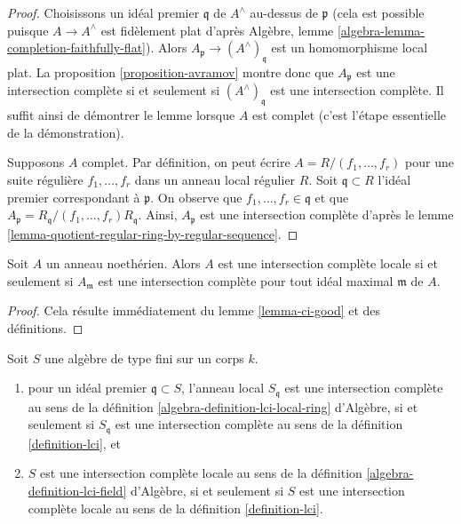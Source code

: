 \begin{proof}
Choisissons un idéal premier $\mathfrak q$ de $A^\wedge$ au-dessus de
$\mathfrak p$
(cela est possible puisque $A \to A^\wedge$ est fidèlement plat d'après
Algèbre, lemme \ref{algebra-lemma-completion-faithfully-flat}).
Alors $A_\mathfrak p \to (A^\wedge)_\mathfrak q$ est un homomorphisme
local plat. La proposition \ref{proposition-avramov} montre donc que
$A_\mathfrak p$ est une intersection complète si et seulement si
$(A^\wedge)_\mathfrak q$ est une intersection complète. Il suffit ainsi
de démontrer le lemme lorsque $A$ est complet (c'est l'étape essentielle
de la démonstration).

\medskip\noindent
Supposons $A$ complet. Par définition, on peut écrire
$A = R/(f_1, \ldots, f_r)$ pour une suite régulière
$f_1, \ldots, f_r$ dans un anneau local régulier $R$.
Soit $\mathfrak q \subset R$ l'idéal premier correspondant à
$\mathfrak p$.
On observe que $f_1, \ldots, f_r \in \mathfrak q$ et que
$A_\mathfrak p = R_\mathfrak q/(f_1, \ldots, f_r)R_\mathfrak q$.
Ainsi, $A_\mathfrak p$ est une intersection complète d'après le
lemme \ref{lemma-quotient-regular-ring-by-regular-sequence}.
\end{proof}

\begin{lemma}
\label{lemma-check-lci-at-maximal-ideals}
Soit $A$ un anneau noethérien. Alors $A$ est une intersection complète
locale si et seulement si $A_\mathfrak m$ est une intersection complète
pour tout idéal maximal $\mathfrak m$ de $A$.
\end{lemma}

\begin{proof}
Cela résulte immédiatement du lemme \ref{lemma-ci-good} et des définitions.
\end{proof}

\begin{lemma}
\label{lemma-check-lci-agrees}
Soit $S$ une algèbre de type fini sur un corps $k$.
\begin{enumerate}
\item pour un idéal premier $\mathfrak q \subset S$, l'anneau local
$S_\mathfrak q$
est une intersection complète au sens de la définition
\ref{algebra-definition-lci-local-ring} d'Algèbre,
si et seulement si $S_\mathfrak q$ est une intersection
complète au sens de la définition \ref{definition-lci}, et
\item $S$ est une intersection complète locale au sens de la définition
\ref{algebra-definition-lci-field} d'Algèbre,
si et seulement si $S$ est une intersection complète
locale au sens de la définition \ref{definition-lci}.
\end{enumerate}
\end{lemma}

